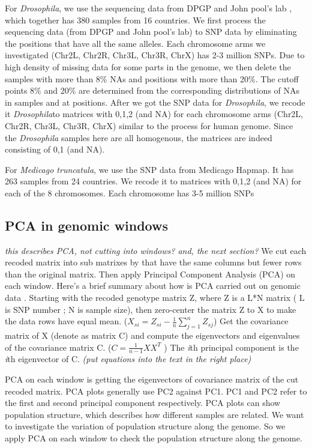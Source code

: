 \documentclass[11pt, oneside]{article}   	%
\newcommand{\plr}[1]{{\em \color{blue} #1}}
\begin{document}
For \textit{Drosophila}, we use the sequencing data from DPGP and John pool's lab \citet{lack2015drosophila}, which together has 380 samples from 16 countries.
We first process the sequencing data (from DPGP and John pool's lab) to SNP data by eliminating the positions that have all the same alleles. 
Each chromosome arms we investigated (Chr2L, Chr2R, Chr3L, Chr3R, ChrX) has 2-3 million SNPs.
Due to high density of missing data for some parts in the genome, we then delete the samples with more than 8\% NAs and positions with more than 20\%. 
The cutoff points 8\% and 20\% are determined from the corresponding distributions of NAs in samples and at positions. 
After we got the SNP data for \textit{Drosophila}, we recode it \textit{Drosophila}to matrices with 0,1,2 (and NA) for each chromosome arms (Chr2L, Chr2R, Chr3L, Chr3R, ChrX) similar to the process for human genome. 
Since the \textit{Drosophila} samples here are all homogenous, the matrices are indeed consisting of 0,1 (and NA). 

For \textit{Medicago truncatula}, we use the SNP data from Medicago Hapmap. It has 263 samples from 24 countries. 
We recode it to matrices with 0,1,2 (and NA) for each of the 8 chromosomes. Each chromosome has 3-5 million SNPs

\subsection{PCA in genomic windows}

\plr{this describes PCA, not cutting into windows? and, the next section?}
We cut each recoded matrix into sub matrixes by that have the same columns but fewer rows than the original matrix. Then apply Principal Component Analysis (PCA) on each window. Here's a brief summary about how is PCA carried out on genomic data \citep{mcvean2009genealogical}. Starting with the recoded genotype matrix Z, where Z is a L*N matrix ( L is SNP number ; N is sample size), then zero-center the matrix Z to X to make the data rows have equal mean. ($X_{si}=Z_{si}-\frac{1}{n}\sum_{j=1}^{n}Z_{sj}$) Get the covariance matrix of X (denote as matrix C) and compute the eigenvectors and eigenvalues of the covariance matrix C. ($C=\frac{1}{n-1}XX^{T}$ ) The \textit{i}th principal component is the \textit{i}th eigenvector of C.
\plr{(put equations into the text in the right place)}

PCA on each window is getting the eigenvectors of covariance matrix of the cut recoded matrix. PCA plots generally use PC2 against PC1.
PC1 and PC2 refer to the first and second principal component respectively. 
PCA plots can show population structure, which describes how different samples are related. 
We want to investigate the variation of population structure along the genome. 
So we apply PCA on each window to check the population structure along the genome.
\end{document}
